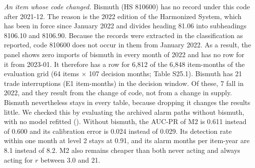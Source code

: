 \textit{An item whose code changed.} Bismuth (HS 810600) has no record under this code after 2021-12. The reason is the 2022 edition of the Harmonized System, which has been in force since January 2022 and divides heading 81.06 into subheadings 8106.10 and 8106.90. Because the records were extracted in the classification as reported, code 810600 does not occur in them from January 2022. As a result, the panel shows zero imports of bismuth in every month of 2022 and has no row for it from 2023-01. It therefore has a row for 6,812 of the 6,848 item-months of the evaluation grid (64 items $\times$ 107 decision months; Table S25.1). Bismuth has 21 trade interruptions (E1 item-months) in the decision window. Of these, 7 fall in 2022, and they result from the change of code, not from a change in supply. Bismuth nevertheless stays in every table, because dropping it changes the results little. We checked this by evaluating the archived alarm paths without bismuth, with no model refitted (). Without bismuth, the AUC-PR of M2 is 0.611 instead of 0.600 and its calibration error is 0.024 instead of 0.029. Its detection rate within one month at level 2 stays at 0.91, and its alarm months per item-year are 8.1 instead of 8.2. M2 also remains cheaper than both never acting and always acting for $r$ between 3.0 and 21.

